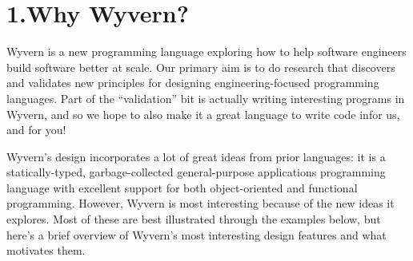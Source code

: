 \documentclass{article}
\begin{document}
\newcommand{\trec}[2]{\mathbf{rec}~#1 . #2}
\newcommand{\trans}[1]{\ll #1 \gg}
\newcommand{\keyw}[1]{\textbf{#1}}
\section{1.\hspace*{0.5em}Why Wyvern?}\label{sec-why-wyvern}%

\noindent{}Wyvern is a new programming language exploring how to help software
engineers build software better at scale.  Our primary aim is to do
research that discovers and validates new principles for designing
engineering-focused programming languages.  Part of the \textquotedblleft{}validation\textquotedblright{}
bit is actually writing interesting programs in Wyvern, and so we
hope to also make it a great language to write code in\textemdash{}for us,
and for you!%

Wyvern's design incorporates a lot of great ideas from prior
languages: it is a statically-typed, garbage-collected general-purpose
applications programming language with excellent support for both
object-oriented and functional programming.  However, Wyvern is most
interesting because of the new ideas it explores.  Most of these are
best illustrated through the examples below, but here's a brief
overview of Wyvern's most interesting design features and what motivates
them.%
\end{document}
